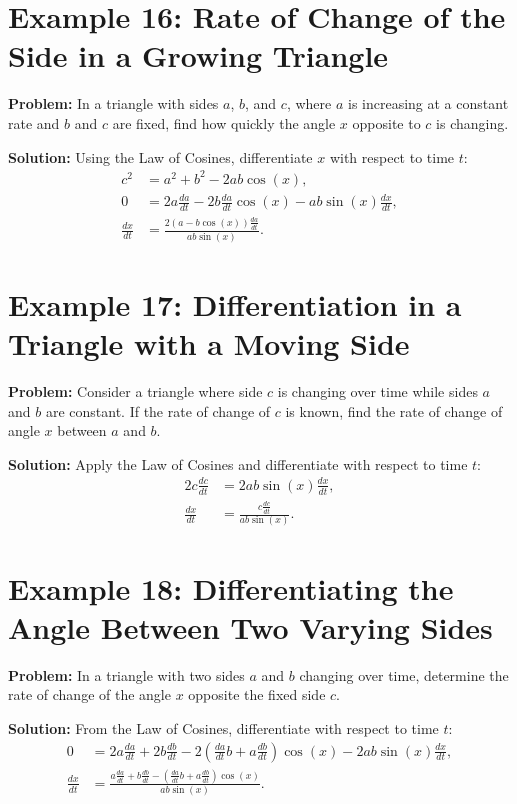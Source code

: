 \documentclass[a4paper,12pt]{book}
\begin{document}
\section*{Example 16: Rate of Change of the Side in a Growing Triangle}
\textbf{Problem:} In a triangle with sides $a$, $b$, and $c$, where $a$ is increasing at a constant rate and $b$ and $c$ are fixed, find how quickly the angle $x$ opposite to $c$ is changing.

\textbf{Solution:}
Using the Law of Cosines, differentiate $x$ with respect to time $t$:
\begin{align*}
c^2 &= a^2 + b^2 - 2ab \cos(x), \\
0 &= 2a \frac{da}{dt} - 2b \frac{da}{dt} \cos(x) - ab \sin(x) \frac{dx}{dt}, \\
\frac{dx}{dt} &= \frac{2(a - b \cos(x)) \frac{da}{dt}}{ab \sin(x)}.
\end{align*}

\section*{Example 17: Differentiation in a Triangle with a Moving Side}
\textbf{Problem:} Consider a triangle where side $c$ is changing over time while sides $a$ and $b$ are constant. If the rate of change of $c$ is known, find the rate of change of angle $x$ between $a$ and $b$.

\textbf{Solution:}
Apply the Law of Cosines and differentiate with respect to time $t$:
\begin{align*}
2c \frac{dc}{dt} &= 2ab \sin(x) \frac{dx}{dt}, \\
\frac{dx}{dt} &= \frac{c \frac{dc}{dt}}{ab \sin(x)}.
\end{align*}

\section*{Example 18: Differentiating the Angle Between Two Varying Sides}
\textbf{Problem:} In a triangle with two sides $a$ and $b$ changing over time, determine the rate of change of the angle $x$ opposite the fixed side $c$.

\textbf{Solution:}
From the Law of Cosines, differentiate with respect to time $t$:
\begin{align*}
0 &= 2a \frac{da}{dt} + 2b \frac{db}{dt} - 2(\frac{da}{dt} b + a \frac{db}{dt})\cos(x) - 2ab\sin(x)\frac{dx}{dt}, \\
\frac{dx}{dt} &= \frac{a \frac{da}{dt} + b \frac{db}{dt} - (\frac{da}{dt} b + a \frac{db}{dt})\cos(x)}{ab \sin(x)}.
\end{align*}
\end{document}
